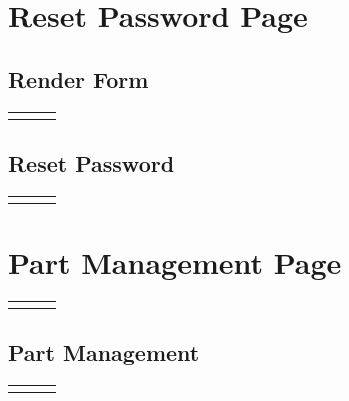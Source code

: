 \documentclass[12pt, letterpaper]{article}
\newcommand{\IPO}[3]{
  \begin{center}
    \begin{tabularx}{\linewidth}{XXX}
      \toprule
      \thead{Input} & \thead{Process} & \thead{Output} \\
      \midrule
      \RaggedRight{#1} & \RaggedRight{#2} & \RaggedRight{#3} \\
      \bottomrule
    \end{tabularx}
  \end{center}
}
\newcommand{\n}{\newline}
\begin{document}
\section{Reset Password Page}

\subsection{Render Form}

\IPO{Reset token (\texttt{string})}{Render new password input\n Render ``submit'' button\n~\n Match reset token with associated account\n\textbf{IF} reset token is not valid\n$\Rightarrow$Disable ``submit'' button}{Form}

\subsection{Reset Password}

\IPO{\begin{enumerate}\item ``Submit'' button\item New password (\texttt{string})\end{enumerate}}{Use the destructured \texttt{resetPassword} function within Redwood's \texttt{useAuth} React hook}{Go to login page (\ref{login})}

\section{Part Management Page}

\IPO{Either:\begin{itemize}\item Redirect\item ``Parts'' button\end{itemize}}{Render admin navigation bar (\ref{adminnavbar})\n Render part management}{Part management page}

\subsection{Part Management}

\IPO{Database query for parts}{Render a ``loading'' placeholder while the database is being queried\n~\n\textbf{IF} no parts found\n$\Rightarrow$Render ``empty'' \n\textbf{ELSE IF} an error occurred\n$\Rightarrow$Render ``error'' \n\textbf{ELSE}\n$\Rightarrow$\textbf{FOR} each part\n$\Rightarrow\Rightarrow$Render part ID, name, description, stock, thumbnail, and creation date in a table row\n$\Rightarrow\Rightarrow$Render ``show'' button, that goes to its part details page (\ref{partdetails})\n$\Rightarrow\Rightarrow$Render ``edit'' button that goes to its edit page (\ref{editpart})\n$\Rightarrow\Rightarrow$Render ``delete'' button that deletes the part (\ref{deletepart})}{Parts list}
\end{document}
